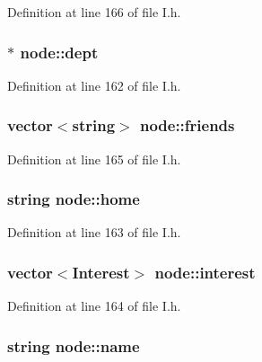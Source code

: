 \-Definition at line 166 of file \-I.\-h.

\hypertarget{structnode_afbdcc9dd588b59ab4ef3ec205a5c2df7}{
\subsubsection[{dept}]{$\ast$ {\bf node\-::dept}}}\label{structnode_afbdcc9dd588b59ab4ef3ec205a5c2df7}


\-Definition at line 162 of file \-I.\-h.

\hypertarget{structnode_ab4fb10bac8cd7b31ec6e9b93ca1f6240}{
\subsubsection[{friends}]{\setlength{\rightskip}{0pt plus 5cm}vector$<$string$>$ {\bf node\-::friends}}}\label{structnode_ab4fb10bac8cd7b31ec6e9b93ca1f6240}


\-Definition at line 165 of file \-I.\-h.

\hypertarget{structnode_aafaced5cb76f544f5c0f5d3a80785be6}{
\subsubsection[{home}]{\setlength{\rightskip}{0pt plus 5cm}string {\bf node\-::home}}}\label{structnode_aafaced5cb76f544f5c0f5d3a80785be6}


\-Definition at line 163 of file \-I.\-h.

\hypertarget{structnode_a6950c053c075ceb7a8651203fd2ec446}{
\subsubsection[{interest}]{\setlength{\rightskip}{0pt plus 5cm}vector$<${\bf \-Interest}$>$ {\bf node\-::interest}}}\label{structnode_a6950c053c075ceb7a8651203fd2ec446}


\-Definition at line 164 of file \-I.\-h.

\hypertarget{structnode_a6f37507fe51c05131068da71ef739323}{
\subsubsection[{name}]{\setlength{\rightskip}{0pt plus 5cm}string {\bf node\-::name}}}\label{structnode_a6f37507fe51c05131068da71ef739323}


